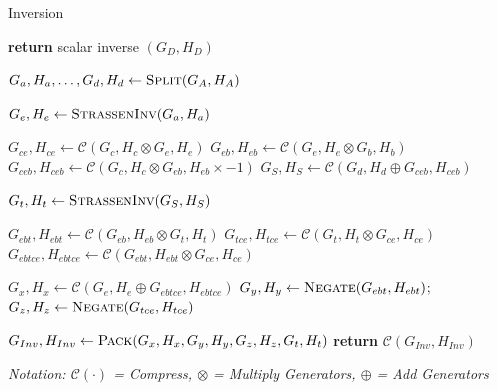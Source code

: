 \begin{frame}{Inversion} 
    \begin{algorithm}[H]
    \scriptsize %
    \caption{Strassen-type Inversion for Generators: \textsc{StrassenInv}($G_A, H_A$)}
    \begin{algorithmic}[1]
        
         \textbf{return} scalar inverse $(G_D, H_D)$ \EndIf {}
        
        \State \textcolor{blue}{$G_a, H_a, \dots, G_d, H_d \gets \textsc{Split}(G_A, H_A)$ }
        
        \State $G_e, H_e \gets \textsc{StrassenInv}(G_a, H_a)$ 
        
        \State $G_{ce}, H_{ce} \gets \mathcal{C}(G_c, H_c \otimes G_e, H_e)$ 
        \State $G_{eb}, H_{eb} \gets \mathcal{C}(G_e, H_e \otimes G_b, H_b)$
        \State $G_{ceb}, H_{ceb} \gets \mathcal{C}(G_c, H_c \otimes G_{eb}, H_{eb} \times -1)$
        \State $G_S, H_S \gets \mathcal{C}(G_d, H_d \oplus G_{ceb}, H_{ceb})$ 
        
        \State $G_t, H_t \gets \textsc{StrassenInv}(G_S, H_S)$ 
        
        \State $G_{ebt}, H_{ebt} \gets \mathcal{C}(G_{eb}, H_{eb} \otimes G_t, H_t)$ 
        \State $G_{tce}, H_{tce} \gets \mathcal{C}(G_t, H_t \otimes G_{ce}, H_{ce})$
        \State $G_{ebtce}, H_{ebtce} \gets \mathcal{C}(G_{ebt}, H_{ebt} \otimes G_{ce}, H_{ce})$
        
        \State $G_x, H_x \gets \mathcal{C}(G_e, H_e \oplus G_{ebtce}, H_{ebtce})$ 
        \State $G_y, H_y \gets \textsc{Negate}(G_{ebt}, H_{ebt})$; \quad $G_z, H_z \gets \textsc{Negate}(G_{tce}, H_{tce})$ 
        
        \State \textcolor{blue}{\textbf{$G_{Inv}, H_{Inv} \gets \textsc{Pack}(G_x, H_x, G_y, H_y, G_z, H_z, G_t, H_t)$} }
        \State \textbf{return} $\mathcal{C}(G_{Inv}, H_{Inv})$
        
    \end{algorithmic}
    \end{algorithm}

    \vspace{-0.2cm}
    {\scriptsize \textit{Notation: $\mathcal{C}(\cdot)$ = Compress, $\otimes$ = Multiply Generators, $\oplus$ = Add Generators}}
    \vspace{-0.1cm}
\end{frame}